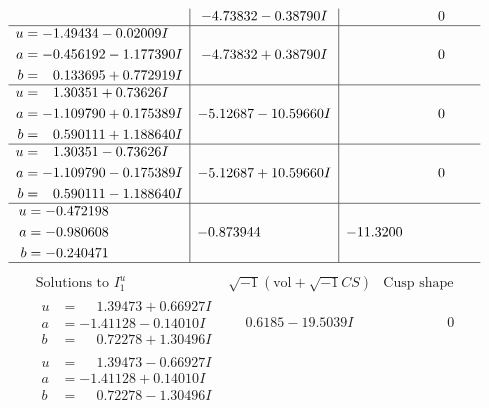 \documentclass[1p]{elsarticle_modified}
\theoremstyle{definition}
\newcommand{\I}{\sqrt{-1}}
\begin{document}
$$\begin{array}{c|c|c}
 & -4.73832 - 0.38790 I & \phantom{-0.000000 } 0 \\ \hline\begin{aligned}
u &= -1.49434 - 0.02009 I \\
a &= -0.456192 - 1.177390 I \\
b &= \phantom{-}0.133695 + 0.772919 I\end{aligned}
 & -4.73832 + 0.38790 I & \phantom{-0.000000 } 0 \\ \hline\begin{aligned}
u &= \phantom{-}1.30351 + 0.73626 I \\
a &= -1.109790 + 0.175389 I \\
b &= \phantom{-}0.590111 + 1.188640 I\end{aligned}
 & -5.12687 - 10.59660 I & \phantom{-0.000000 } 0 \\ \hline\begin{aligned}
u &= \phantom{-}1.30351 - 0.73626 I \\
a &= -1.109790 - 0.175389 I \\
b &= \phantom{-}0.590111 - 1.188640 I\end{aligned}
 & -5.12687 + 10.59660 I & \phantom{-0.000000 } 0 \\ \hline\begin{aligned}
u &= -0.472198\phantom{ +0.000000I} \\
a &= -0.980608\phantom{ +0.000000I} \\
b &= -0.240471\phantom{ +0.000000I}\end{aligned}
 & -0.873944\phantom{ +0.000000I} & -11.3200\phantom{ +0.000000I}\\
 \hline 
 \end{array}$$\newpage$$\begin{array}{c|c|c}  
\text{Solutions to }I^u_{1}& \I (\text{vol} + \sqrt{-1}CS) & \text{Cusp shape}\\
 \hline 
\begin{aligned}
u &= \phantom{-}1.39473 + 0.66927 I \\
a &= -1.41128 - 0.14010 I \\
b &= \phantom{-}0.72278 + 1.30496 I\end{aligned}
 & \phantom{-}0.6185 - 19.5039 I & \phantom{-0.000000 } 0 \\ \hline\begin{aligned}
u &= \phantom{-}1.39473 - 0.66927 I \\
a &= -1.41128 + 0.14010 I \\
b &= \phantom{-}0.72278 - 1.30496 I\end{aligned}

\end{array}$$
\end{document}
